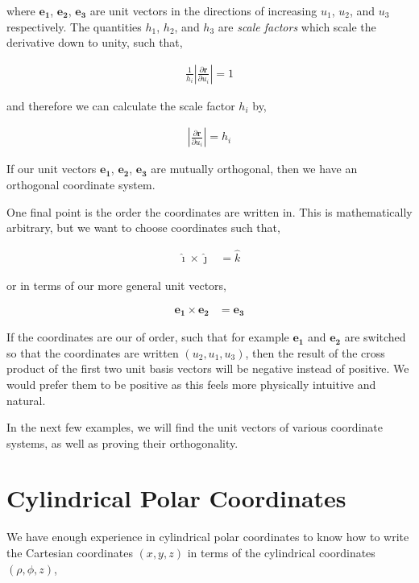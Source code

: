 \documentclass[11pt]{amsart}
\begin{document}
where $\mathbf{e_1}$, $\mathbf{e_2}$, $\mathbf{e_3}$ are unit vectors in the directions of increasing $u_1$, $u_2$, and $u_3$ respectively. The quantities $h_1$, $h_2$, and $h_3$ are \textit{scale factors} which scale the derivative down to unity, such that,

\begin{align*}
  \frac{1}{h_i} \left|\frac{\partial\mathbf{r}}{\partial u_i}\right| = 1
\end{align*}

and therefore we can calculate the scale factor $h_i$ by,

\begin{align*}
  \left|\frac{\partial\mathbf{r}}{\partial u_i}\right| = h_i
\end{align*}




If our unit vectors $\mathbf{e_1}$, $\mathbf{e_2}$, $\mathbf{e_3}$ are mutually orthogonal, then we have an orthogonal coordinate system.

One final point is the order the coordinates are written in. This is mathematically arbitrary, but we want to choose coordinates such that,

\begin{align*}
  \hat{\imath}\times\hat{\jmath}&=\hat{k}
\end{align*}

or in terms of our more general unit vectors,

\begin{align*}
  \mathbf{e_1}\times\mathbf{e_2}&=\mathbf{e_3}
\end{align*}

If the coordinates are our of order, such that for example $\mathbf{e_1}$ and $\mathbf{e_2}$ are switched so that the coordinates are written $(u_2, u_1, u_3)$, then the result of the cross product of the first two unit basis vectors will be negative instead of positive. We would prefer them to be positive as this feels more physically intuitive and natural.

In the next few examples, we will find the unit vectors of various coordinate systems, as well as proving their orthogonality.

\section{Cylindrical Polar Coordinates}

We have enough experience in cylindrical polar coordinates to know how to write the Cartesian coordinates $(x, y, z)$ in terms of the cylindrical coordinates $(\rho, \phi, z)$,
\end{document}
